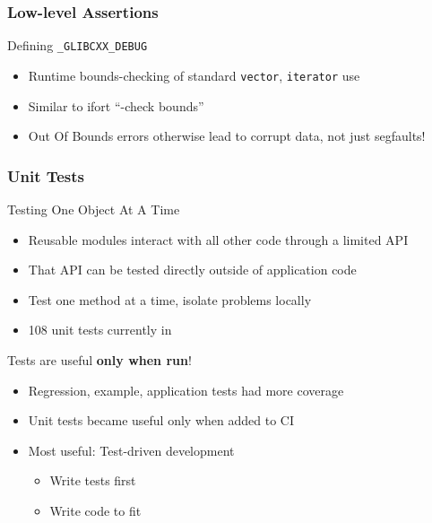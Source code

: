 \begin{frame}
\frametitle{Low-level Assertions}
\begin{block}{Defining \texttt{\_GLIBCXX\_DEBUG}}
\begin{itemize}
\item Runtime bounds-checking of standard \texttt{vector},
\texttt{iterator} use
\item Similar to ifort ``-check bounds''
\item Out Of Bounds errors otherwise lead to corrupt data, not just
segfaults!
\end{itemize}
\end{block}

\end{frame}


\begin{frame}
\frametitle{Unit Tests}
\begin{block}{Testing One Object At A Time}
\begin{itemize}
\item Reusable modules interact with all other code through a limited
API
\item That API can be tested directly outside of application code
\item Test one method at a time, isolate problems locally
\item 108 unit tests currently in \libMesh
\end{itemize}
\end{block}

\pause

\begin{block}{Tests are useful {\bf only when run}!}
\begin{itemize}
\item Regression, example, application tests had more coverage
\item Unit tests became useful only when added to CI
\item Most useful: Test-driven development
\begin{itemize}
    \item Write tests first
    \item Write code to fit
\end{itemize}
\end{itemize}
\end{block}
\end{frame}

